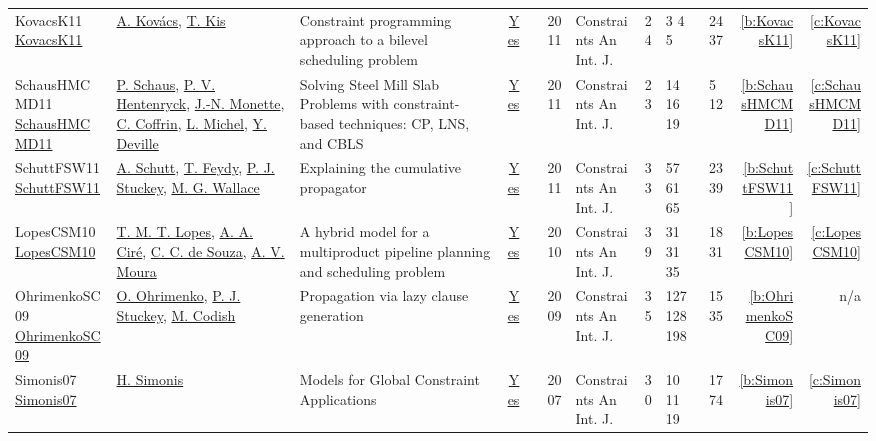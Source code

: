 {\begin{longtable}{>{\raggedright\arraybackslash}p{3cm}>{\raggedright\arraybackslash}p{4.5cm}>{\raggedright\arraybackslash}p{6.0cm}rrrp{2.5cm}rp{1cm}p{1cm}rr}
KovacsK11 \href{https://doi.org/10.1007/s10601-010-9102-3}{KovacsK11} & \hyperref[auth:a146]{A. Kov{\'{a}}cs}, \hyperref[auth:a155]{T. Kis} & Constraint programming approach to a bilevel scheduling problem & \href{../works/KovacsK11.pdf}{Yes} & \cite{KovacsK11} & 2011 & Constraints An Int. J. & 24 & 3 4 5 & 24 37 & \ref{b:KovacsK11} & \ref{c:KovacsK11}\\
SchausHMCMD11 \href{https://doi.org/10.1007/s10601-010-9100-5}{SchausHMCMD11} & \hyperref[auth:a147]{P. Schaus}, \hyperref[auth:a148]{P. V. Hentenryck}, \hyperref[auth:a149]{J.-N. Monette}, \hyperref[auth:a150]{C. Coffrin}, \hyperref[auth:a32]{L. Michel}, \hyperref[auth:a151]{Y. Deville} & \cellcolor{green!10}Solving Steel Mill Slab Problems with constraint-based techniques: CP, LNS, and {CBLS} & \href{../works/SchausHMCMD11.pdf}{Yes} & \cite{SchausHMCMD11} & 2011 & Constraints An Int. J. & 23 & 14 16 19 & 5 12 & \ref{b:SchausHMCMD11} & \ref{c:SchausHMCMD11}\\
SchuttFSW11 \href{https://doi.org/10.1007/s10601-010-9103-2}{SchuttFSW11} & \hyperref[auth:a124]{A. Schutt}, \hyperref[auth:a154]{T. Feydy}, \hyperref[auth:a125]{P. J. Stuckey}, \hyperref[auth:a117]{M. G. Wallace} & Explaining the cumulative propagator & \href{../works/SchuttFSW11.pdf}{Yes} & \cite{SchuttFSW11} & 2011 & Constraints An Int. J. & 33 & 57 61 65 & 23 39 & \ref{b:SchuttFSW11} & \ref{c:SchuttFSW11}\\
LopesCSM10 \href{https://doi.org/10.1007/s10601-009-9086-z}{LopesCSM10} & \hyperref[auth:a156]{T. M. T. Lopes}, \hyperref[auth:a157]{A. A. Cir{\'{e}}}, \hyperref[auth:a158]{C. C. de Souza}, \hyperref[auth:a159]{A. V. Moura} & A hybrid model for a multiproduct pipeline planning and scheduling problem & \href{../works/LopesCSM10.pdf}{Yes} & \cite{LopesCSM10} & 2010 & Constraints An Int. J. & 39 & 31 31 35 & 18 31 & \ref{b:LopesCSM10} & \ref{c:LopesCSM10}\\
OhrimenkoSC09 \href{http://dx.doi.org/10.1007/s10601-008-9064-x}{OhrimenkoSC09} & \hyperref[auth:a861]{O. Ohrimenko}, \hyperref[auth:a125]{P. J. Stuckey}, \hyperref[auth:a862]{M. Codish} & Propagation via lazy clause generation & \href{../works/OhrimenkoSC09.pdf}{Yes} & \cite{OhrimenkoSC09} & 2009 & Constraints An Int. J. & 35 & 127 128 198 & 15 35 & \ref{b:OhrimenkoSC09} & n/a\\
Simonis07 \href{https://doi.org/10.1007/s10601-006-9011-7}{Simonis07} & \hyperref[auth:a17]{H. Simonis} & Models for Global Constraint Applications & \href{../works/Simonis07.pdf}{Yes} & \cite{Simonis07} & 2007 & Constraints An Int. J. & 30 & 10 11 19 & 17 74 & \ref{b:Simonis07} & \ref{c:Simonis07}\\

\end{longtable}}
